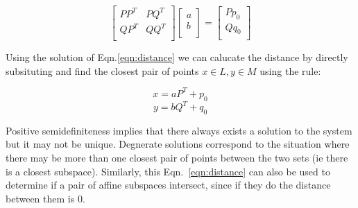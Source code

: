 \documentclass{article}[11pt]
\begin{document}
\begin{equation}
\label{eqn:distance}
\left [ \begin{array}{cc}
P P^T & P Q^T \\
Q P^T & Q Q^T \\
\end{array} \right ]
\left [ \begin{array}{c}
a \\
b \\
\end{array} \right ] = 
\left [ \begin{array}{c}
P p_0 \\
Q q_0 \\
\end{array} \right ]
\end{equation}

Using the solution of Eqn.\ref{eqn:distance} we can calucate the distance by directly subsituting and find the closest pair of points $x \in L, y \in M$  using the rule:

\[ x = a P^T + p_0 \]
\[ y = b Q^T + q_0 \]

Positive semidefiniteness implies that there always exists a solution to the system but it may not be unique.  Degnerate solutions correspond to the situation where there may be more than one closest pair of points between the two sets (ie there is a closest subspace).  Similarly, this Eqn.~\ref{eqn:distance} can also be used to determine if a pair of affine subspaces intersect, since if they do the distance between them is 0.
\end{document}
